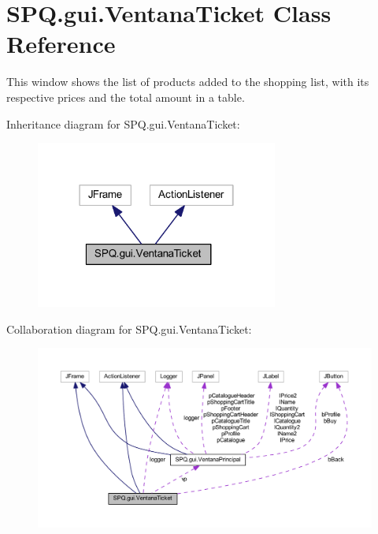 \hypertarget{class_s_p_q_1_1gui_1_1_ventana_ticket}{}\section{S\+P\+Q.\+gui.\+Ventana\+Ticket Class Reference}
\label{class_s_p_q_1_1gui_1_1_ventana_ticket}


This window shows the list of products added to the shopping list, with its respective prices and the total amount in a table.  




Inheritance diagram for S\+P\+Q.\+gui.\+Ventana\+Ticket\+:\nopagebreak
\begin{figure}[H]
\begin{center}
\leavevmode
\includegraphics[width=226pt]{class_s_p_q_1_1gui_1_1_ventana_ticket__inherit__graph}
\end{center}
\end{figure}


Collaboration diagram for S\+P\+Q.\+gui.\+Ventana\+Ticket\+:\nopagebreak
\begin{figure}[H]
\begin{center}
\leavevmode
\includegraphics[width=350pt]{class_s_p_q_1_1gui_1_1_ventana_ticket__coll__graph}
\end{center}
\end{figure}
